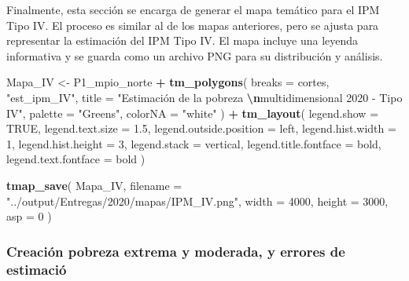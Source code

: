 \documentclass[
  12pt,
]{book}
\newenvironment{Shaded}{\begin{snugshade}}{\end{snugshade}}
\newcommand{\AttributeTok}[1]{\textcolor[rgb]{0.13,0.29,0.53}{#1}}
\newcommand{\ConstantTok}[1]{\textcolor[rgb]{0.56,0.35,0.01}{#1}}
\newcommand{\DecValTok}[1]{\textcolor[rgb]{0.00,0.00,0.81}{#1}}
\newcommand{\FloatTok}[1]{\textcolor[rgb]{0.00,0.00,0.81}{#1}}
\newcommand{\FunctionTok}[1]{\textcolor[rgb]{0.13,0.29,0.53}{\textbf{#1}}}
\newcommand{\NormalTok}[1]{#1}
\newcommand{\OtherTok}[1]{\textcolor[rgb]{0.56,0.35,0.01}{#1}}
\newcommand{\SpecialCharTok}[1]{\textcolor[rgb]{0.81,0.36,0.00}{\textbf{#1}}}
\newcommand{\StringTok}[1]{\textcolor[rgb]{0.31,0.60,0.02}{#1}}
\begin{document}
Finalmente, esta sección se encarga de generar el mapa temático para el IPM Tipo IV. El proceso es similar al de los mapas anteriores, pero se ajusta para representar la estimación del IPM Tipo IV. El mapa incluye una leyenda informativa y se guarda como un archivo PNG para su distribución y análisis.

\begin{Shaded}
\begin{Highlighting}[]
\NormalTok{Mapa\_IV }\OtherTok{\textless{}{-}}
\NormalTok{  P1\_mpio\_norte }\SpecialCharTok{+} \FunctionTok{tm\_polygons}\NormalTok{(}
    \AttributeTok{breaks =}\NormalTok{ cortes,}
    \StringTok{"est\_ipm\_IV"}\NormalTok{,}
    \AttributeTok{title =} \StringTok{"Estimación de la pobreza }\SpecialCharTok{\textbackslash{}n}\StringTok{multidimensional 2020 {-} Tipo IV"}\NormalTok{,}
    \AttributeTok{palette =} \StringTok{"Greens"}\NormalTok{,}
    \AttributeTok{colorNA =} \StringTok{"white"}
\NormalTok{  ) }\SpecialCharTok{+} \FunctionTok{tm\_layout}\NormalTok{(}
    \AttributeTok{legend.show =} \ConstantTok{TRUE}\NormalTok{,}
    \AttributeTok{legend.text.size =} \FloatTok{1.5}\NormalTok{,}
    \AttributeTok{legend.outside.position =} \StringTok{\textquotesingle{}left\textquotesingle{}}\NormalTok{,}
    \AttributeTok{legend.hist.width =} \DecValTok{1}\NormalTok{,}
    \AttributeTok{legend.hist.height =} \DecValTok{3}\NormalTok{,}
    \AttributeTok{legend.stack =} \StringTok{\textquotesingle{}vertical\textquotesingle{}}\NormalTok{,}
    \AttributeTok{legend.title.fontface =} \StringTok{\textquotesingle{}bold\textquotesingle{}}\NormalTok{,}
    \AttributeTok{legend.text.fontface =} \StringTok{\textquotesingle{}bold\textquotesingle{}}
\NormalTok{  )}

\FunctionTok{tmap\_save}\NormalTok{(}
\NormalTok{  Mapa\_IV,}
  \AttributeTok{filename =} \StringTok{"../output/Entregas/2020/mapas/IPM\_IV.png"}\NormalTok{,}
  \AttributeTok{width =} \DecValTok{4000}\NormalTok{,}
  \AttributeTok{height =} \DecValTok{3000}\NormalTok{,}
  \AttributeTok{asp =} \DecValTok{0}
\NormalTok{)}
\end{Highlighting}
\end{Shaded}

\hypertarget{creaciuxf3n-pobreza-extrema-y-moderada-y-errores-de-estimaciuxf3}{%
\subsubsection*{Creación pobreza extrema y moderada, y errores de estimació}\label{creaciuxf3n-pobreza-extrema-y-moderada-y-errores-de-estimaciuxf3}}
\end{document}
